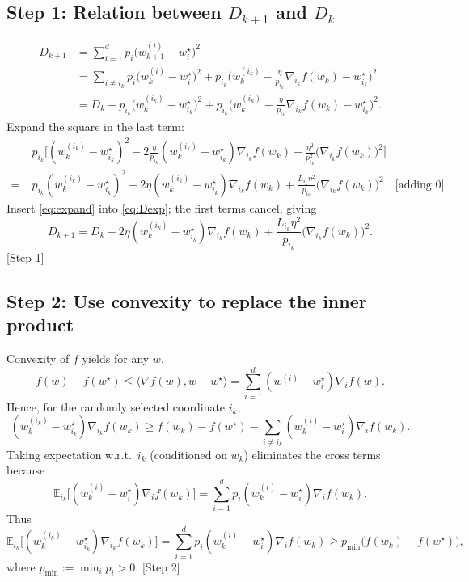 \documentclass[11pt]{article}
\begin{document}
\subsection*{Step 1: Relation between $D_{k+1}$ and $D_k$}
\begin{align}
D_{k+1}
&=\sum_{i=1}^{d}p_i\big(w_{k+1}^{(i)}-w^{\star}_i\big)^{2} \nonumber\\
&=\sum_{i\neq i_k}p_i\big(w_{k}^{(i)}-w^{\star}_i\big)^{2}
   +p_{i_k}\Big(w_{k}^{(i_k)}-\frac{\eta}{p_{i_k}}\nabla_{i_k}f(w_k)-w^{\star}_{i_k}\Big)^{2}\nonumber\\
&=D_k- p_{i_k}\big(w_{k}^{(i_k)}-w^{\star}_{i_k}\big)^{2}
   +p_{i_k}\Big(w_{k}^{(i_k)}-\frac{\eta}{p_{i_k}}\nabla_{i_k}f(w_k)-w^{\star}_{i_k}\Big)^{2}.\label{eq:Dexp}
\end{align}
Expand the square in the last term:
\begin{align}
&\;p_{i_k}\Big[(w_{k}^{(i_k)}-w^{\star}_{i_k})^{2}
      -2\frac{\eta}{p_{i_k}}(w_{k}^{(i_k)}-w^{\star}_{i_k})\nabla_{i_k}f(w_k)
      +\frac{\eta^{2}}{p_{i_k}^{2}}\big(\nabla_{i_k}f(w_k)\big)^{2}\Big]\nonumber\\
=&\;p_{i_k}(w_{k}^{(i_k)}-w^{\star}_{i_k})^{2}
   -2\eta (w_{k}^{(i_k)}-w^{\star}_{i_k})\nabla_{i_k}f(w_k)
   +\frac{L_{i_k}\eta^{2}}{p_{i_k}}\big(\nabla_{i_k}f(w_k)\big)^{2}
   \quad\text{[adding $0$]}.\label{eq:expand}
\end{align}
Insert \eqref{eq:expand} into \eqref{eq:Dexp}; the first terms cancel, giving
\begin{equation}
D_{k+1}=D_k-2\eta (w_{k}^{(i_k)}-w^{\star}_{i_k})\nabla_{i_k}f(w_k)
       +\frac{L_{i_k}\eta^{2}}{p_{i_k}}\big(\nabla_{i_k}f(w_k)\big)^{2}.
\label{eq:Dnext}
\end{equation}
[Step 1]  

\subsection*{Step 2: Use convexity to replace the inner product}
Convexity of $f$ yields for any $w$,
\[
f(w)-f(w^{\star})\le \langle \nabla f(w), w-w^{\star}\rangle
   =\sum_{i=1}^{d}(w^{(i)}-w^{\star}_i)\nabla_i f(w).
\]
Hence, for the randomly selected coordinate $i_k$,
\[
(w_{k}^{(i_k)}-w^{\star}_{i_k})\nabla_{i_k}f(w_k)
\ge f(w_k)-f(w^{\star}) -\!\!\sum_{i\neq i_k}(w_{k}^{(i)}-w^{\star}_i)\nabla_i f(w_k).
\]
Taking expectation w.r.t.\ $i_k$ (conditioned on $w_k$) eliminates the cross terms because
\[
\mathbb{E}_{i_k}\!\big[(w_{k}^{(i)}-w^{\star}_i)\nabla_i f(w_k)\big]
   =\sum_{i=1}^{d}p_i (w_{k}^{(i)}-w^{\star}_i)\nabla_i f(w_k).
\]
Thus
\begin{equation}
\mathbb{E}_{i_k}\!\big[(w_{k}^{(i_k)}-w^{\star}_{i_k})\nabla_{i_k}f(w_k)\big]
   =\sum_{i=1}^{d}p_i (w_{k}^{(i)}-w^{\star}_i)\nabla_i f(w_k)
   \ge p_{\min}\big(f(w_k)-f(w^{\star})\big),
\label{eq:innerexp}
\end{equation}
where $p_{\min}:=\min_i p_i>0$.  
[Step 2]  
\end{document}
